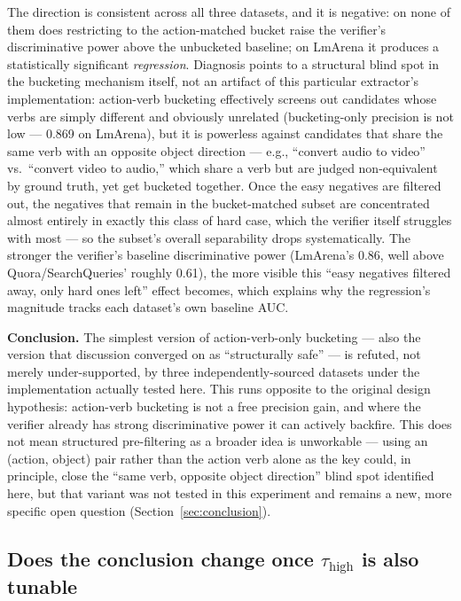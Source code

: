 \documentclass[11pt]{article}
\newcommand{\tauhigh}{\ensuremath{\tau_{\text{high}}}}
\begin{document}
The direction is consistent across all three datasets, and it is negative: on none of them does restricting to the action-matched bucket raise the verifier's discriminative power above the unbucketed baseline; on LmArena it produces a statistically significant \emph{regression}. Diagnosis points to a structural blind spot in the bucketing mechanism itself, not an artifact of this particular extractor's implementation: action-verb bucketing effectively screens out candidates whose verbs are simply different and obviously unrelated (bucketing-only precision is not low --- 0.869 on LmArena), but it is powerless against candidates that share the same verb with an opposite object direction --- e.g., ``convert audio to video'' vs.\ ``convert video to audio,'' which share a verb but are judged non-equivalent by ground truth, yet get bucketed together. Once the easy negatives are filtered out, the negatives that remain in the bucket-matched subset are concentrated almost entirely in exactly this class of hard case, which the verifier itself struggles with most --- so the subset's overall separability drops systematically. The stronger the verifier's baseline discriminative power (LmArena's 0.86, well above Quora/SearchQueries' roughly 0.61), the more visible this ``easy negatives filtered away, only hard ones left'' effect becomes, which explains why the regression's magnitude tracks each dataset's own baseline AUC.

\textbf{Conclusion.} The simplest version of action-verb-only bucketing --- also the version that discussion converged on as ``structurally safe'' --- is refuted, not merely under-supported, by three independently-sourced datasets under the implementation actually tested here. This runs opposite to the original design hypothesis: action-verb bucketing is not a free precision gain, and where the verifier already has strong discriminative power it can actively backfire. This does not mean structured pre-filtering as a broader idea is unworkable --- using an (action, object) pair rather than the action verb alone as the key could, in principle, close the ``same verb, opposite object direction'' blind spot identified here, but that variant was not tested in this experiment and remains a new, more specific open question (Section~\ref{sec:conclusion}).

\subsection{Does the conclusion change once $\tauhigh$ is also tunable}
\label{sec:tauhigh}
\end{document}
